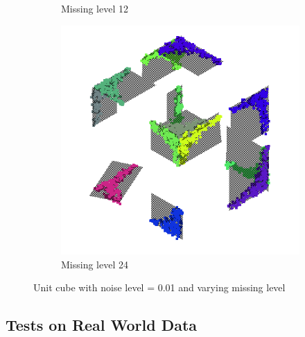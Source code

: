 \begin{figure}[ht!]
\begin{subfigure}[b]{0.25\textwidth}
        \caption{Missing level 12}
    \end{subfigure}%
    \begin{subfigure}[b]{0.25\textwidth}
        \centering
        \includegraphics[width=0.9\linewidth]{python/plots/cube_points/data/matrix/cube_points_m24_n01_primitives}
        \caption{Missing level 24}
    \end{subfigure}%
    \caption{Unit cube with noise level = 0.01 and varying missing level}
    \label{fig:test-both}

\end{figure}

\subsection{Tests on Real World Data}\label{subsec:ransac-tests-on-real-world-data}

